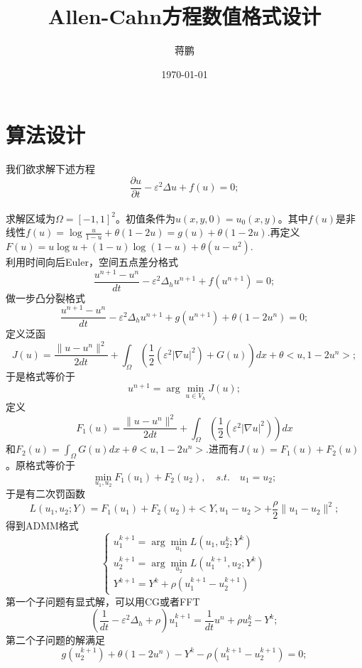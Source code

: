\documentclass[11pt,a4 paper,one side]{article}
\title{Allen-Cahn方程数值格式设计}
\date{\today}
\author{蒋鹏}
\begin{document}
\maketitle
\tableofcontents
\section{算法设计}
我们欲求解下述方程\begin{equation}
    \frac{\partial u}{\partial t}- \varepsilon^2 \Delta u + f(u) = 0;
\end{equation}
\\ 求解区域为$\Omega = [-1,1]^2$。初值条件为$u(x,y,0) = u_0(x,y)$。其中$f(u)$是非线性$f(u) = \log{\frac{u}{1-u}}+\theta (1-2u)=g(u)+\theta (1-2u)$.再定义$F(u) = u\log{u}+(1-u)\log{(1-u)}+\theta (u-u^2)$.
\\利用时间向后Euler，空间五点差分格式 \begin{equation}
    \frac{u^{n+1}-u^n}{dt} - \varepsilon^2 \Delta_h u^{n+1} + f(u^{n+1})=0;
\end{equation}
做一步凸分裂格式\begin{equation}
    \frac{u^{n+1}-u^n}{dt} - \varepsilon^2 \Delta_h u^{n+1} + g(u^{n+1}) +\theta (1-2u^n)=0;
\end{equation}
定义泛函\begin{equation}
    J(u) = \frac{\|u-u^n\|^2}{2dt}+ \int_{\Omega} ( \frac{1}{2}(\varepsilon^2 |\nabla u|^2 ) + G(u) ) dx + \theta <u,1-2u^n>;
\end{equation}
于是格式等价于\begin{equation}
    u^{n+1} = \arg \min_{u \in V_h} J(u);
\end{equation}
定义\begin{equation}
    F_1(u) = \frac{\|u-u^n\|^2}{2dt} + \int_{\Omega} (\frac{1}{2}(\varepsilon^2 |\nabla u|^2 )) dx
\end{equation}
和$F_2(u) =  \int_{\Omega} G(u) dx + \theta <u,1-2u^n>$.进而有$J(u) = F_1(u)+F_2(u)$。原格式等价于\begin{equation}
    \min_{u_1,u_2} F_1(u_1) + F_2(u_2), \quad s.t. \quad u_1=u_2;
\end{equation}
于是有二次罚函数\begin{equation}
    L(u_1,u_2;Y) = F_1(u_1) + F_2(u_2) + <Y,u_1-u_2> + \frac{\rho}{2}\|u_1-u_2\|^2;
\end{equation}
得到ADMM格式\begin{equation}
    \begin{cases}
        u_1^{k+1} = \arg \min_{u_1} L(u_1,u_2^k;Y^k) \\
        u_2^{k+1} = \arg \min_{u_2} L(u_1^{k+1},u_2;Y^k) \\
        Y^{k+1} = Y^k + \rho (u_1^{k+1}-u_2^{k+1})
    \end{cases}
\end{equation}
第一个子问题有显式解，可以用CG或者FFT\begin{equation}
    (\frac{1}{dt}-\varepsilon^2 \Delta_h + \rho)u_1^{k+1} = \frac{1}{dt}u^n + \rho u_2^k - Y^k;
\end{equation}
第二个子问题的解满足\begin{equation}
    g(u_2^{k+1})+\theta (1-2u^n) - Y^k -\rho (u_1^{k+1}-u_2^{k+1})=0;
\end{equation}
\end{document}

